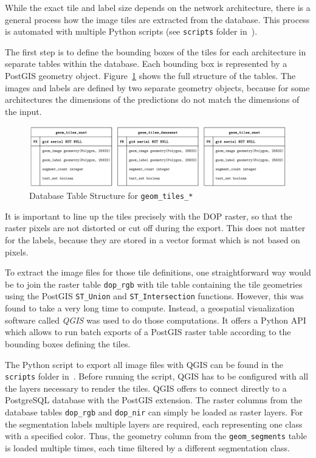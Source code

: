 While the exact tile and label size depends on the network architecture, there is a general process how the image tiles are extracted from the database. This process is automated with multiple Python scripts (see \texttt{scripts} folder in~\cite{thesis-code20}).

The first step is to define the bounding boxes of the tiles for each architecture in separate tables within the database. Each bounding box is represented by a  PostGIS geometry object. Figure~\ref{fig:geom_tiles_entities} shows the full structure of the tables. The images and labels are defined by two separate geometry objects, because for some architectures the dimensions of the predictions do not match the dimensions of the input.

\begin{figure}[h]
    \centering
    \includegraphics[width=\textwidth]{images/geom_tiles_entities}
    \caption{Database Table Structure for \texttt{geom\_tiles\_*}}
    \label{fig:geom_tiles_entities}
\end{figure}

It is important to line up the tiles precisely with the DOP raster, so that the raster pixels are not distorted or cut off during the export. This does not matter for the labels, because they are stored in a vector format which is not based on pixels.

To extract the image files for those tile definitions, one straightforward way would be to join the raster table \texttt{dop\_rgb} with tile table containing the tile geometries using the PostGIS \texttt{ST\_Union} and \texttt{ST\_Intersection} functions. However, this was found to take a very long time to compute. Instead, a geospatial visualization software called \emph{QGIS} was used to do those computations. It offers a Python API which allows to run batch exports of a PostGIS raster table according to the bounding boxes defining the tiles.

The Python script to export all image files with QGIS can be found in the \texttt{scripts} folder in~\cite{thesis-code20}. Before running the script, QGIS has to be configured with all the layers necessary to render the tiles. QGIS offers to connect directly to a PostgreSQL database with the PostGIS extension. The raster columns from the database tables \texttt{dop\_rgb} and \texttt{dop\_nir} can simply be loaded as raster layers. For the segmentation labels multiple layers are required, each representing one class with a specified color. Thus, the geometry column from the \texttt{geom\_segments} table is loaded multiple times, each time filtered by a different segmentation class.

